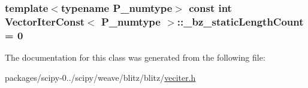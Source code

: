 \subsubsection[{\+\_\+bz\+\_\+static\+Length\+Count}]{\setlength{\rightskip}{0pt plus 5cm}template$<$typename P\+\_\+numtype$>$ const int {\bf Vector\+Iter\+Const}$<$ P\+\_\+numtype $>$\+::\+\_\+bz\+\_\+static\+Length\+Count = 0\hspace{0.3cm}{\ttfamily [static]}}\label{classVectorIterConst_afd959c64a5ed086e9f494dd672e6c425}


The documentation for this class was generated from the following file\+:\begin{DoxyCompactItemize}
\item 
packages/scipy-\/0../scipy/weave/blitz/blitz/\hyperlink{veciter_8h}{veciter.\+h}\end{DoxyCompactItemize}
